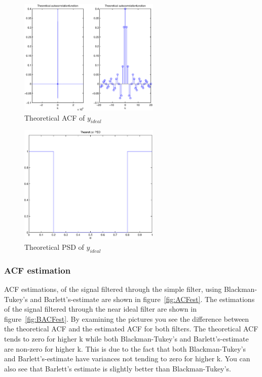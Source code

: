 \documentclass[10pt]{article}
\begin{document}
\begin{figure}[!hp]

    \begin{center}
      \includegraphics[width=0.6\textwidth]{BTheoACF}
    \caption{Theoretical ACF of $y_{ideal}$ \label{fig:TheoACFideal}}

    \end{center}

\end{figure}

\begin{figure}[!hp]

    \begin{center}
      \includegraphics[width=0.6\textwidth]{BTheoPSD}
    \caption{Theoretical PSD of $y_{ideal}$ \label{fig:TheoPSDideal}}
    \end{center}

\end{figure}

\clearpage

\subsubsection{ACF estimation}

ACF estimations, of the signal filtered through the simple filter, using Blackman-
Tukey’s and Barlett’s-estimate are shown in figure~\ref{fig:ACFest}. The estimations of the signal
filtered through the near ideal filter are shown in figure~\ref{fig:BACFest}.
By examining the pictures you see the difference between the theoretical ACF and
the estimated ACF for both filters. The theoretical ACF tends to zero for higher k
while both Blackman-Tukey’s and Barlett’s-estimate are non-zero for higher k. This is
due to the fact that both Blackman-Tukey’s and Barlett’s-estimate have variances not
tending to zero for higher k. You can also see that Barlett’s estimate is slightly better
than Blackman-Tukey’s. \\
\end{document}
